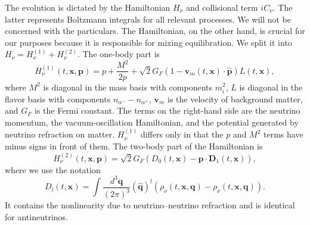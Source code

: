 \documentclass[aps,prd,twocolumn,groupedaddress,preprintnumbers]{revtex4-2}
\begin{document}
The evolution is dictated by the Hamiltonian $H_\nu$ and collisional term $iC_\nu$. The latter represents Boltzmann integrals for all relevant processes. We will not be concerned with the particulars. The Hamiltonian, on the other hand, is crucial for our purposes because it is responsible for mixing equilibration. We split it into $H_\nu = H_\nu^{(1)} + H_\nu^{(2)}$. The one-body part is
\begin{equation}
H_\nu^{(1)} \left( t, \boldsymbol{x}, \boldsymbol{p} \right) = p + \frac{M^2}{2 p} + \sqrt{2} G_F \left( 1 - \boldsymbol{v}_m ( t, \boldsymbol{x} ) \cdot \boldsymbol{\hat{p}} \right) L (t, \boldsymbol{x}), \label{eq:Hnu1}
\end{equation}
where $M^2$ is diagonal in the mass basis with components $m_i^2$, $L$ is diagonal in the flavor basis with components $n_{\alpha^-} - n_{\alpha^+}$, $\boldsymbol{v}_m$ is the velocity of background matter, and $G_F$ is the Fermi constant. The terms on the right-hand side are the neutrino momentum, the vacuum-oscillation Hamiltonian, and the potential generated by neutrino refraction on matter. $H_{\bar{\nu}}^{(1)}$ differs only in that the $p$ and $M^2$ terms have minus signs in front of them. The two-body part of the Hamiltonian is
\begin{equation}
H_{\nu}^{(2)} \left( t, \boldsymbol{x}, \boldsymbol{p} \right) = \sqrt{2} G_F \left( D_0 \left( t, \boldsymbol{x} \right) - \boldsymbol{\hat{p}} \cdot \boldsymbol{D}_1 \left( t, \boldsymbol{x} \right) \right), \label{eq:Hnu2}
\end{equation}
where we use the notation
\begin{equation}
D_l \left( t, \boldsymbol{x} \right) = \int \frac{d^3 \boldsymbol{q}}{(2\pi)^3} \left( \boldsymbol{\hat{q}} \right)^l \left( \rho_\nu \left( t, \boldsymbol{x}, \boldsymbol{q} \right) - \rho_{\bar{\nu}} \left( t, \boldsymbol{x}, \boldsymbol{q} \right) \right). \label{eq:Dmatrices}
\end{equation}
It contains the nonlinearity due to neutrino--neutrino refraction and is identical for antineutrinos.
\end{document}
